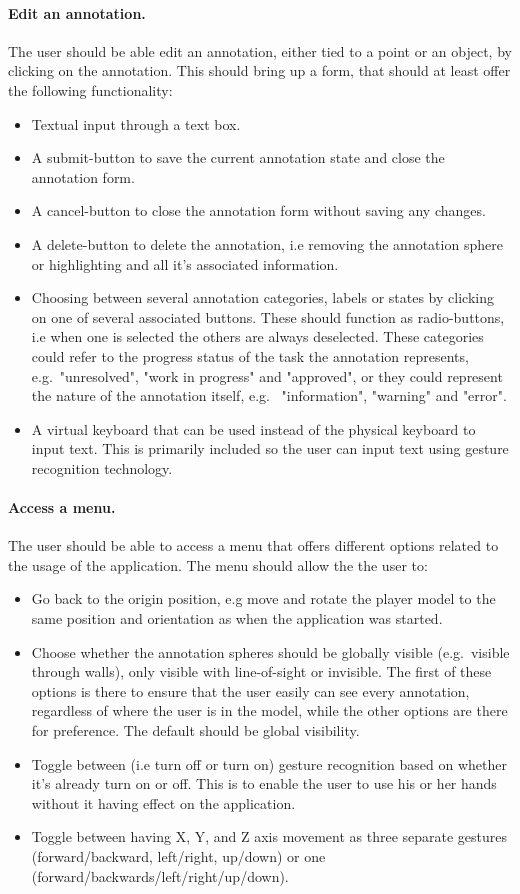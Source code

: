 \paragraph{Edit an annotation.} The user should be able edit an annotation, either tied to a point or an object, by clicking on the annotation. 
This should bring up a form, that should at least offer the following functionality:
\begin{itemize}
	\item Textual input through a text box.
	\item A submit-button to save the current annotation state and close the annotation form.
	\item A cancel-button to close the annotation form without saving any changes.
	\item A delete-button to delete the annotation, i.e removing the annotation sphere or highlighting and all it's associated information. 
	\item Choosing between several annotation categories, labels or states by clicking on one of several associated buttons. 
			These should function as radio-buttons, i.e when one is selected the others are always deselected.
			These categories could refer to the progress status of the task the annotation represents, e.g.~"unresolved", "work in progress" and "approved",
			or they could represent the nature of the annotation itself, e.g.~ "information", "warning" and "error".

	\item A virtual keyboard that can be used instead of the physical keyboard to input text. This is primarily included so the user can input text using 
			gesture recognition technology.
\end{itemize}

\paragraph{Access a menu.} The user should be able to access a menu that offers different options related to the usage of the application.
The menu should allow the the user to:
\begin{itemize}
	\item Go back to the origin position, e.g move and rotate the player model to the same position and orientation as when the application was started.
	\item Choose whether the annotation spheres should be globally visible (e.g.~visible through walls), only visible with line-of-sight or invisible.
		  The first of these options is there to ensure that the user easily can see every annotation, regardless of where the user is in the model,
		  while the other options are there for preference. The default should be global visibility.
	\item Toggle between (i.e turn off or turn on) gesture recognition based on whether it's already turn on or off.
		  This is to enable the user to use his or her hands without it having effect on the application. 
	\item Toggle between having X, Y, and Z axis movement as three separate gestures (forward/backward, left/right, up/down) or one (forward/backwards/left/right/up/down). 
\end{itemize}